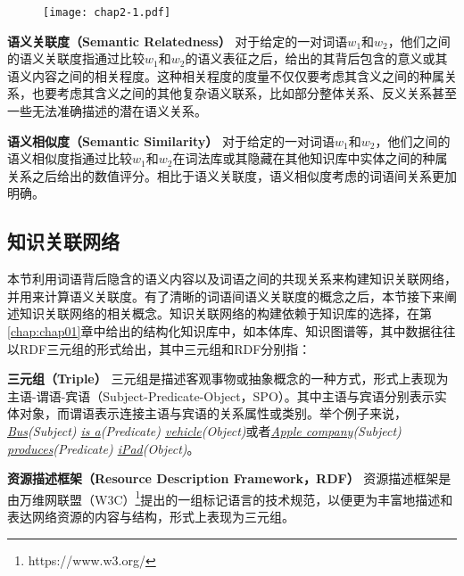 \begin{figure}[!htb]
    \centerline{\texttt{[image: chap2-1.pdf]}}
    \label{chap2-1}
\end{figure}

\begin{definition}
    \label{sr}
    {\bf 语义关联度（Semantic Relatedness）}
    对于给定的一对词语$w_1$和$w_2$，他们之间的语义关联度指通过比较$w_1$和$w_2$的语义表征之后，给出的其背后包含的意义或其语义内容之间的相关程度。这种相关程度的度量不仅仅要考虑其含义之间的种属关系，也要考虑其含义之间的其他复杂语义联系，比如部分整体关系、反义关系甚至一些无法准确描述的潜在语义关系。
\end{definition}

\begin{definition}
    \label{ss}
    {\bf 语义相似度（Semantic Similarity）}
    对于给定的一对词语$w_1$和$w_2$，他们之间的语义相似度指通过比较$w_1$和$w_2$在词法库或其隐藏在其他知识库中实体之间的种属关系之后给出的数值评分。相比于语义关联度，语义相似度考虑的词语间关系更加明确。
\end{definition}

\subsection{知识关联网络}
本节利用词语背后隐含的语义内容以及词语之间的共现关系来构建知识关联网络，并用来计算语义关联度。有了清晰的词语间语义关联度的概念之后，本节接下来阐述知识关联网络的相关概念。知识关联网络的构建依赖于知识库的选择，在第\ref{chap:chap01}章中给出的结构化知识库中，如本体库、知识图谱等，其中数据往往以RDF三元组的形式给出，其中三元组和RDF分别指：

\begin{definition}
    \label{triple}
    {\bf 三元组（Triple）}
    三元组是描述客观事物或抽象概念的一种方式，形式上表现为主语-谓语-宾语（Subject-Predicate-Object，SPO）。其中主语与宾语分别表示实体对象，而谓语表示连接主语与宾语的关系属性或类别。举个例子来说，\emph{\underline{Bus}(Subject) \underline{is a}(Predicate) \underline{vehicle}(Object)}或者\emph{\underline{Apple company}(Subject) \underline{produces}(Predicate) \underline{iPad}(Object)}。
\end{definition}

\begin{definition}
    \label{rdf}
    {\bf 资源描述框架（Resource Description Framework，RDF）}
    资源描述框架是由万维网联盟（W3C）\footnote{https://www.w3.org/}提出的一组标记语言的技术规范，以便更为丰富地描述和表达网络资源的内容与结构，形式上表现为三元组。
\end{definition}

